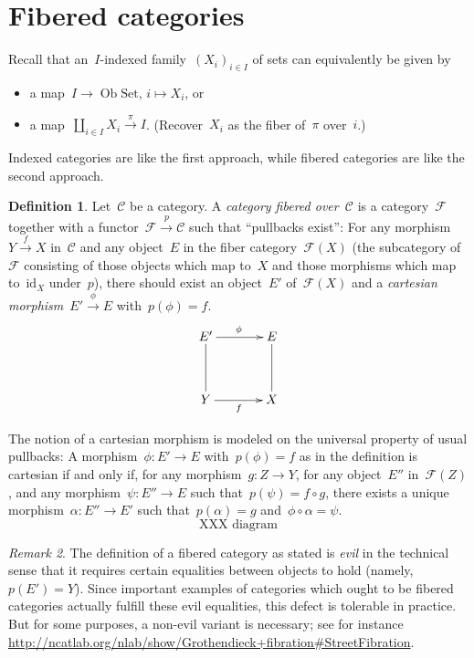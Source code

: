 \documentclass[a4paper,english,12pt]{scrartcl}
\theoremstyle{definition}
\newtheorem{defn}{Definition}[section]
\theoremstyle{plain}
\theoremstyle{remark}
\newtheorem{rem}[defn]{Remark}
\newcommand{\C}{\mathcal{C}}
\newcommand{\F}{\mathcal{F}}
\newcommand{\id}{\mathrm{id}}
\newcommand{\xra}[1]{\xrightarrow{#1}}
\newcommand{\Set}{\mathrm{Set}}
\newcommand{\Ob}{\operatorname{Ob}}
\begin{document}
\section{Fibered categories}

Recall that an~$I$-indexed family~$(X_i)_{i \in I}$ of sets can equivalently be
given by
\begin{itemize}
\item a map~$I \to \Ob\Set$, $i \mapsto X_i$, or
\item a map~$\coprod_{i \in I} X_i \xra{\pi} I$. (Recover~$X_i$ as the fiber
of~$\pi$ over~$i$.)
\end{itemize}
Indexed categories are like the first approach, while fibered categories are
like the second approach.

\begin{defn}Let~$\C$ be a category. A \emph{category fibered over~$\C$} is a
category~$\F$ together with a functor~$\F \xra{p} \C$ such that ``pullbacks
exist'': For any morphism~$Y \xra{f} X$ in~$\C$ and any object~$E$ in the fiber
category~$\F(X)$ (the subcategory of~$\F$ consisting of those objects which map
to~$X$ and those morphisms which map to~$\id_X$ under~$p$), there should
exist an object~$E'$ of~$\F(X)$ and a \emph{cartesian morphism}~$E' \xra{\phi}
E$ with~$p(\phi) = f$.
\[ \xymatrixcolsep{3pc}\xymatrixrowsep{3pc}\xymatrix{
  E' \ar@{-}[d] \ar^\phi[r] & E \ar@{-}[d] \\
  Y \ar[r]_f & X
} \]
\end{defn}

The notion of a cartesian morphism is modeled on the universal property of
usual pullbacks: A morphism~$\phi : E' \to E$ with~$p(\phi) = f$ as in the
definition is cartesian if and only if, for any morphism~$g : Z \to Y$, for any
object~$E''$ in~$\F(Z)$, and any morphism~$\psi : E'' \to E$ such that~$p(\psi)
= f \circ g$, there exists a unique morphism~$\alpha : E'' \to E'$ such
that~$p(\alpha) = g$ and~$\phi \circ \alpha = \psi$.
\[ \text{XXX diagram} \]

\begin{rem}The definition of a fibered category as stated is \emph{evil} in the
technical sense that it requires certain equalities between objects to hold (namely,
$p(E') = Y$). Since important examples of categories which ought to be fibered
categories actually fulfill these evil equalities, this defect is tolerable in
practice. But for some purposes, a non-evil variant is necessary; see for
instance
\url{http://ncatlab.org/nlab/show/Grothendieck+fibration#StreetFibration}.\end{rem}
\end{document}
